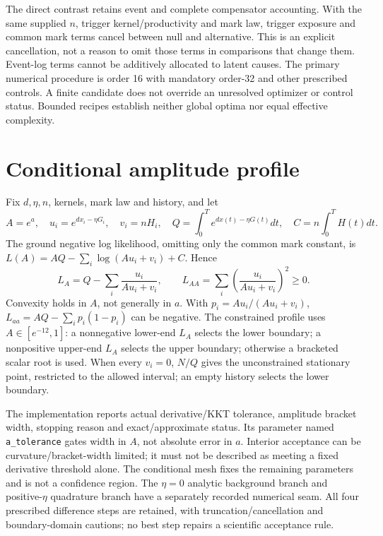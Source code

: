 \documentclass[11pt]{article}
\begin{document}
The direct contrast retains event and complete compensator accounting.
With the same supplied $n$, trigger kernel/productivity and mark law, trigger
exposure and common mark terms cancel between null and alternative. This is
an explicit cancellation, not a reason to omit those terms in comparisons
that change them. Event-log terms cannot be additively allocated to latent
causes. The primary numerical procedure is order 16 with mandatory order-32
and other prescribed controls. A finite candidate does not override an
unresolved optimizer or control status. Bounded recipes establish neither
global optima nor equal effective complexity.

\section*{Conditional amplitude profile}
Fix $d,\eta,n$, kernels, mark law and history, and let
\[
 A=e^a,\quad u_i=e^{d x_i-\eta G_i},\quad v_i=nH_i,\quad
 Q=\int_0^T e^{d x(t)-\eta G(t)}dt,\quad C=n\int_0^TH(t)dt .
\]
The ground negative log likelihood, omitting only the common mark constant,
is $L(A)=AQ-\sum_i\log(Au_i+v_i)+C$. Hence
\[
 L_A=Q-\sum_i\frac{u_i}{Au_i+v_i},\qquad
 L_{AA}=\sum_i\left(\frac{u_i}{Au_i+v_i}\right)^2\geq0 .
\]
Convexity holds in $A$, not generally in $a$. With
$p_i=Au_i/(Au_i+v_i)$, $L_{aa}=AQ-\sum_i p_i(1-p_i)$ can be negative.
The constrained profile uses $A\in[e^{-12},1]$: a nonnegative lower-end
$L_A$ selects the lower boundary; a nonpositive upper-end $L_A$ selects the
upper boundary; otherwise a bracketed scalar root is used. When every
$v_i=0$, $N/Q$ gives the unconstrained stationary point, restricted to the
allowed interval; an empty history selects the lower boundary.

The implementation reports actual derivative/KKT tolerance, amplitude
bracket width, stopping reason and exact/approximate status. Its parameter
named \texttt{a\_tolerance} gates width in $A$, not absolute error in $a$.
Interior acceptance can be curvature/bracket-width limited; it must not be
described as meeting a fixed derivative threshold alone. The conditional
mesh fixes the remaining parameters and is not a confidence region.
The $\eta=0$ analytic background branch and positive-$\eta$ quadrature branch
have a separately recorded numerical seam. All four prescribed difference
steps are retained, with truncation/cancellation and boundary-domain cautions;
no best step repairs a scientific acceptance rule.
\end{document}
